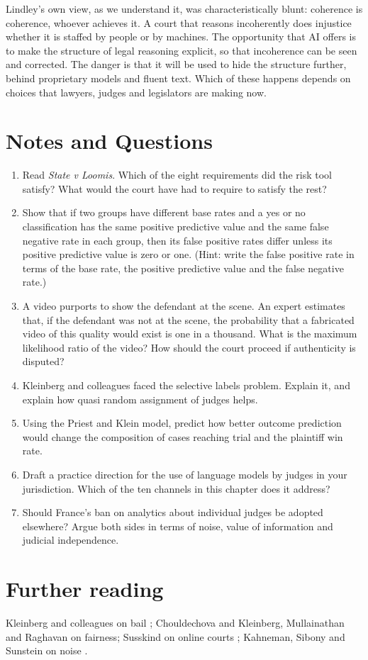 Lindley's own view, as we understand it, was characteristically blunt: coherence is coherence, whoever achieves it. A court that reasons incoherently does injustice whether it is staffed by people or by machines. The opportunity that AI offers is to make the structure of legal reasoning explicit, so that incoherence can be seen and corrected. The danger is that it will be used to hide the structure further, behind proprietary models and fluent text. Which of these happens depends on choices that lawyers, judges and legislators are making now.

\section*{Notes and Questions}
\begin{enumerate}[label=\arabic*.]
\item Read \emph{State v Loomis}. Which of the eight requirements did the risk tool satisfy? What would the court have had to require to satisfy the rest?
\item Show that if two groups have different base rates and a yes or no classification has the same positive predictive value and the same false negative rate in each group, then its false positive rates differ unless its positive predictive value is zero or one. (Hint: write the false positive rate in terms of the base rate, the positive predictive value and the false negative rate.)
\item A video purports to show the defendant at the scene. An expert estimates that, if the defendant was not at the scene, the probability that a fabricated video of this quality would exist is one in a thousand. What is the maximum likelihood ratio of the video? How should the court proceed if authenticity is disputed?
\item Kleinberg and colleagues faced the selective labels problem. Explain it, and explain how quasi random assignment of judges helps.
\item Using the Priest and Klein model, predict how better outcome prediction would change the composition of cases reaching trial and the plaintiff win rate.
\item Draft a practice direction for the use of language models by judges in your jurisdiction. Which of the ten channels in this chapter does it address?
\item Should France's ban on analytics about individual judges be adopted elsewhere? Argue both sides in terms of noise, value of information and judicial independence.
\end{enumerate}

\section*{Further reading}
Kleinberg and colleagues on bail \citep{kleinberg2018}; Chouldechova \citep{chouldechova2017} and Kleinberg, Mullainathan and Raghavan \citep{kleinberg2017} on fairness; Susskind on online courts \citep{susskind2019}; Kahneman, Sibony and Sunstein on noise \citep{kahneman2021}.
